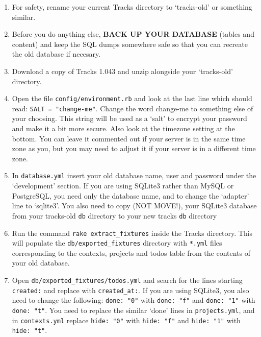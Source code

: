 \documentclass[10pt,twoside]{memoir}
\begin{document}
\begin{enumerate}


\item For safety, rename your current Tracks directory to `tracks-old' or something similar.

\item Before you do anything else, \textbf{BACK UP YOUR DATABASE} (tables and content) and keep the SQL dumps somewhere safe so that you can recreate the old database if necesary.

\item Download a copy of Tracks 1.043 and unzip alongside your `tracks-old' directory.

\item Open the file \texttt{config/environment.rb} and look at the last line which should read: \texttt{SALT = "change-me"}. Change the word change-me to something else of your choosing. This string will be used as a `salt' to encrypt your password and make it a bit more secure. Also look at the timezone setting at the bottom. You can leave it commented out if your server is in the same time zone as you, but you may need to adjust it if your server is in a different time zone.

\item In \texttt{database.yml} insert your old database name, user and password under the `development' section. If you are using SQLite3 rather than MySQL or PostgreSQL, you need only the database name, and to change the `adapter' line to `sqlite3'. You also need to copy (NOT MOVE!), your SQLite3 database from your tracks-old \texttt{db} directory to your new tracks \texttt{db} directory

\item Run the command \texttt{rake extract\_fixtures} inside the Tracks directory. This will populate the \texttt{db/exported\_fixtures} directory with \texttt{*.yml} files corresponding to the contexts, projects and todos table from the contents of your old database.

\item Open \texttt{db/exported\_fixtures/todos.yml} and search for the lines starting \texttt{created:} and replace with \texttt{created\_at:}. If you are using SQLite3, you also need to change the following: \texttt{done: "0"} with \texttt{done: "f"} and \texttt{done: "1"} with \texttt{done: "t"}. You need to replace the similar `done' lines in \texttt{projects.yml}, and in \texttt{contexts.yml} replace \texttt{hide: "0"} with \texttt{hide: "f"} and \texttt{hide: "1"} with \texttt{hide: "t"}.


\end{enumerate}
\end{document}
